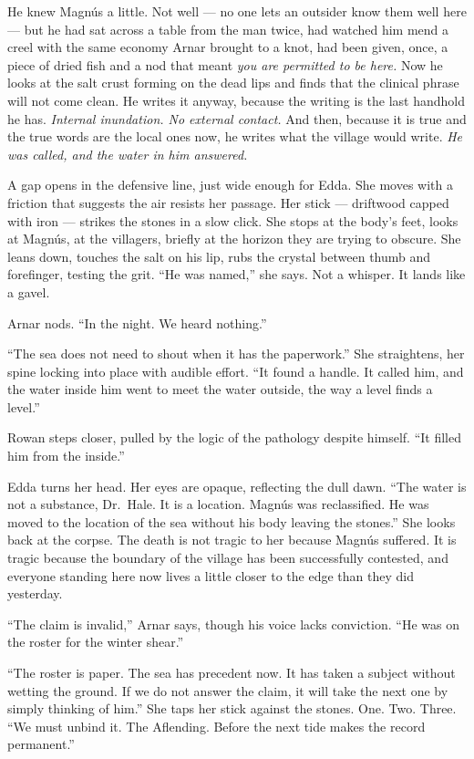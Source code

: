 \documentclass[11pt,oneside]{book}
\begin{document}
He knew Magnús a little. Not well --- no one lets an outsider know them
well here --- but he had sat across a table from the man twice, had
watched him mend a creel with the same economy Arnar brought to a knot,
had been given, once, a piece of dried fish and a nod that meant
\emph{you are permitted to be here.} Now he looks at the salt crust
forming on the dead lips and finds that the clinical phrase will not
come clean. He writes it anyway, because the writing is the last
handhold he has. \emph{Internal inundation. No external contact.} And
then, because it is true and the true words are the local ones now, he
writes what the village would write. \emph{He was called, and the water
in him answered.}

A gap opens in the defensive line, just wide enough for Edda. She moves
with a friction that suggests the air resists her passage. Her stick ---
driftwood capped with iron --- strikes the stones in a slow click. She
stops at the body's feet, looks at Magnús, at the villagers, briefly at
the horizon they are trying to obscure. She leans down, touches the salt
on his lip, rubs the crystal between thumb and forefinger, testing the
grit. ``He was named,'' she says. Not a whisper. It lands like a gavel.

Arnar nods. ``In the night. We heard nothing.''

``The sea does not need to shout when it has the paperwork.'' She
straightens, her spine locking into place with audible effort. ``It
found a handle. It called him, and the water inside him went to meet the
water outside, the way a level finds a level.''

Rowan steps closer, pulled by the logic of the pathology despite
himself. ``It filled him from the inside.''

Edda turns her head. Her eyes are opaque, reflecting the dull dawn.
``The water is not a substance, Dr.~Hale. It is a location. Magnús was
reclassified. He was moved to the location of the sea without his body
leaving the stones.'' She looks back at the corpse. The death is not
tragic to her because Magnús suffered. It is tragic because the boundary
of the village has been successfully contested, and everyone standing
here now lives a little closer to the edge than they did yesterday.

``The claim is invalid,'' Arnar says, though his voice lacks conviction.
``He was on the roster for the winter shear.''

``The roster is paper. The sea has precedent now. It has taken a subject
without wetting the ground. If we do not answer the claim, it will take
the next one by simply thinking of him.'' She taps her stick against the
stones. One. Two. Three. ``We must unbind it. The Aflending. Before the
next tide makes the record permanent.''
\end{document}
